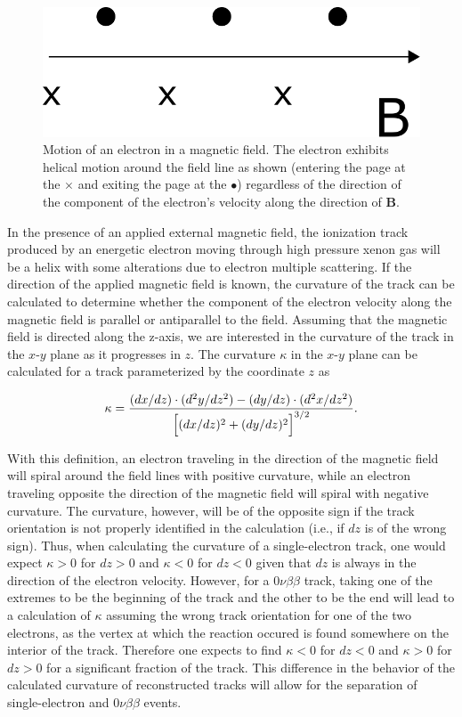 \documentclass{JINST}
\begin{document}
\begin{figure}[!htb]
	\centering
	\includegraphics[scale=0.48]{fig/bfield_motion.pdf}
	\caption{\label{fig_bfieldmotion}Motion of an electron in a magnetic field.  The electron exhibits helical motion around the field line as shown (entering the page at the $\times$ and exiting the page at the $\bullet$) regardless of the direction of the component of the electron's velocity along the direction of $\mathbf{B}$.}
\end{figure}

In the presence of an applied external magnetic field, the ionization track produced by an energetic electron moving 
through high pressure xenon gas will be a helix with some alterations due to electron multiple scattering.  If the direction
of the applied magnetic field is known, the curvature of the track can be calculated to determine whether the component
of the electron velocity along the magnetic field is parallel or antiparallel to the field.  Assuming that the magnetic field is directed along the z-axis, we are interested in the curvature of the track in the $x$-$y$ 
plane as it progresses in $z$.  The curvature $\kappa$ in the $x$-$y$ plane can be calculated for a track
parameterized by the coordinate $z$ as

\begin{equation}\label{eqn_curv}
\kappa = \frac{(dx/dz)\cdot(d^2y/dz^2) - (dy/dz)\cdot(d^2x/dz^2)}{\Bigl[(dx/dz)^2 + (dy/dz)^2\Bigr]^{3/2}}.
\end{equation}

With this definition, an electron traveling in the direction of the magnetic field will spiral around the field lines with positive curvature, while an electron traveling opposite the direction of the magnetic field will spiral with negative curvature.  The curvature, however, will be of the opposite sign if the track orientation is not properly identified in the calculation (i.e., if $dz$ is of the wrong sign).  Thus, when calculating the curvature of a single-electron track, one would expect $\kappa > 0$ for $dz > 0$ and $\kappa < 0$ for $dz < 0$ given that $dz$ is always in the direction of the electron velocity.  However, for a $0\nu\beta\beta$ track, taking one of the extremes to be the beginning of the track and the other to be the end will lead to a calculation of $\kappa$ assuming the wrong track orientation for one of the two electrons, as the vertex at which the reaction occured is found somewhere on the interior of the track.  Therefore one expects to find $\kappa < 0$ for $dz < 0$ and $\kappa > 0$ for $dz > 0$ for a significant fraction of the track.  This difference in the behavior of the calculated curvature of reconstructed tracks will allow for the separation of single-electron and $0\nu\beta\beta$ events.
\end{document}
